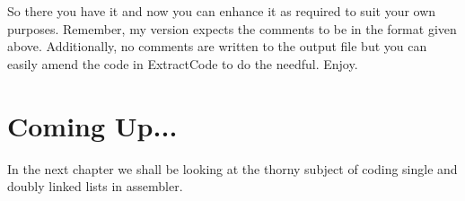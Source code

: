 So there you have it and now you can enhance it as required to
      suit your own purposes. Remember, my version expects the comments to be
      in the format given above. Additionally, no comments are written to the
      output file but you can easily amend the code in ExtractCode to do the
      needful. Enjoy.

\section{Coming Up...}
\label{ch9-the-end}%

In the next chapter we shall be looking at the thorny subject of
    coding single and doubly linked lists in assembler.

